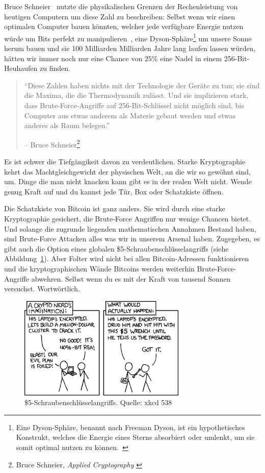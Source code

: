 Bruce Schneier~\cite{web:schneier} nutzte die physikalischen Grenzen der
Rechenleistung von heutigen Computern um diese Zahl zu beschreiben: Selbst wenn
wir einen optimalen Computer bauen könnten, welcher jede verfügbare Energie
nutzen würde um Bits perfekt zu manipulieren~\cite{wiki:landauer}, eine
Dyson-Sphäre\footnote{Eine Dyson-Sphäre, benannt nach Freeman Dyson, ist ein
hypothetisches Konstrukt, welches die Energie eines Sterns absorbiert oder
umlenkt, um sie somit optimal nutzen zu können.~\cite{wiki:dyson}} um unsere
Sonne herum bauen und sie 100 Milliarden Milliarden Jahre lang laufen lassen
würden, hätten wir immer noch nur eine Chance von $25\%$ eine Nadel in einem
256-Bit-Heuhaufen zu finden.

\begin{quotation}\begin{samepage}
\enquote{Diese Zahlen haben nichts mit der Technologie der Geräte zu tun; sie
sind die Maxima, die die Thermodynamik zulässt. Und sie implizieren stark, dass
Brute-Force-Angriffe auf 256-Bit-Schlüssel nicht möglich sind, bis Computer aus
etwas anderem als Materie gebaut werden und etwas anderes als Raum belegen.}
\begin{flushright} -- Bruce Schneier\footnote{Bruce Schneier, \textit{Applied Cryptography} \cite{bruce-schneier}}
\end{flushright}\end{samepage}\end{quotation}

Es ist schwer die Tiefgängikeit davon zu verdeutlichen. Starke Kryptographie
kehrt das Machtgleichgewicht der physischen Welt, an die wir so gewöhnt sind,
um. Dinge die man nicht knacken kann gibt es in der realen Welt nicht. Wende
genug Kraft auf und du kannst jede Tür, Box oder Schatzkiste öffnen.

Die Schatzkiste von Bitcoin ist ganz anders. Sie wird durch eine starke
Kryptographie gesichert, die Brute-Force Angriffen nur wenige Chancen bietet.
Und solange die zugrunde liegenden mathematischen Annahmen Bestand haben, sind
Brute-Force Attacken alles was wir in unserem Arsenal haben. Zugegeben, es gibt
auch die Option eines globalen \$5-Schraubenschlüsselangriffs (siehe
Abbildung~\ref{fig:xkcd-538}). Aber Folter wird nicht bei allen Bitcoin-Adressen
funktionieren und die kryptographischen Wände Bitcoins werden weiterhin
Brute-Force-Angriffe abwehren. Selbst wenn du es mit der Kraft von tausend
Sonnen versuchst. Wortwörtlich.

\begin{figure}
  \centering
  \includegraphics[width=8cm]{assets/images/xkcd-538.png}
  \caption{\$5-Schraubenschlüsselangriffs. Quelle: xkcd 538}
  \label{fig:xkcd-538}
\end{figure}

